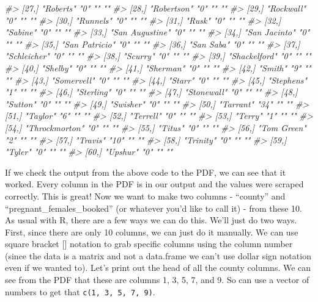 \documentclass[
  12pt,
]{book}
\newenvironment{Shaded}{\begin{snugshade}}{\end{snugshade}}
\newcommand{\CommentTok}[1]{\textcolor[rgb]{0.37,0.37,0.37}{\textit{#1}}}
\begin{document}
\begin{Shaded}
\begin{Highlighting}[]
\CommentTok{\#> [27,] "Roberts"       "0"  ""              ""   }
\CommentTok{\#> [28,] "Robertson"     "0"  ""              ""   }
\CommentTok{\#> [29,] "Rockwall"      "0"  ""              ""   }
\CommentTok{\#> [30,] "Runnels"       "0"  ""              ""   }
\CommentTok{\#> [31,] "Rusk"          "0"  ""              ""   }
\CommentTok{\#> [32,] "Sabine"        "0"  ""              ""   }
\CommentTok{\#> [33,] "San Augustine" "0"  ""              ""   }
\CommentTok{\#> [34,] "San Jacinto"   "0"  ""              ""   }
\CommentTok{\#> [35,] "San Patricio"  "0"  ""              ""   }
\CommentTok{\#> [36,] "San Saba"      "0"  ""              ""   }
\CommentTok{\#> [37,] "Schleicher"    "0"  ""              ""   }
\CommentTok{\#> [38,] "Scurry"        "0"  ""              ""   }
\CommentTok{\#> [39,] "Shackelford"   "0"  ""              ""   }
\CommentTok{\#> [40,] "Shelby"        "0"  ""              ""   }
\CommentTok{\#> [41,] "Sherman"       "0"  ""              ""   }
\CommentTok{\#> [42,] "Smith"         "9"  ""              ""   }
\CommentTok{\#> [43,] "Somervell"     "0"  ""              ""   }
\CommentTok{\#> [44,] "Starr"         "0"  ""              ""   }
\CommentTok{\#> [45,] "Stephens"      "1"  ""              ""   }
\CommentTok{\#> [46,] "Sterling"      "0"  ""              ""   }
\CommentTok{\#> [47,] "Stonewall"     "0"  ""              ""   }
\CommentTok{\#> [48,] "Sutton"        "0"  ""              ""   }
\CommentTok{\#> [49,] "Swisher"       "0"  ""              ""   }
\CommentTok{\#> [50,] "Tarrant"       "34" ""              ""   }
\CommentTok{\#> [51,] "Taylor"        "6"  ""              ""   }
\CommentTok{\#> [52,] "Terrell"       "0"  ""              ""   }
\CommentTok{\#> [53,] "Terry"         "1"  ""              ""   }
\CommentTok{\#> [54,] "Throckmorton"  "0"  ""              ""   }
\CommentTok{\#> [55,] "Titus"         "0"  ""              ""   }
\CommentTok{\#> [56,] "Tom Green"     "2"  ""              ""   }
\CommentTok{\#> [57,] "Travis"        "10" ""              ""   }
\CommentTok{\#> [58,] "Trinity"       "0"  ""              ""   }
\CommentTok{\#> [59,] "Tyler"         "0"  ""              ""   }
\CommentTok{\#> [60,] "Upshur"        "0"  ""              ""}
\end{Highlighting}
\end{Shaded}

If we check the output from the above code to the PDF, we can see that it worked. Every column in the PDF is in our output and the values were scraped correctly. This is great! Now we want to make two columns - ``county'' and ``pregnant\_females\_booked'' (or whatever you'd like to call it) - from these 10. As usual with R, there are a few ways we can do this. We'll just do two ways. First, since there are only 10 columns, we can just do it manually. We can use square bracket {[}{]} notation to grab specific columns using the column number (since the data is a matrix and not a data.frame we can't use dollar sign notation even if we wanted to). Let's print out the head of all the county columns. We can see from the PDF that these are columns 1, 3, 5, 7, and 9. So can use a vector of numbers to get that \texttt{c(1,\ 3,\ 5,\ 7,\ 9)}.
\end{document}
